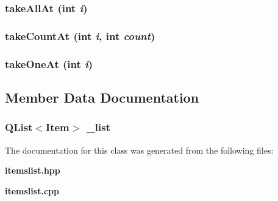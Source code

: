\subsubsection{ take\-All\-At (int {\em i})}\label{classItemsList_a6}


\subsubsection{ take\-Count\-At (int {\em i}, int {\em count})}\label{classItemsList_a8}


\subsubsection{ take\-One\-At (int {\em i})}\label{classItemsList_a7}




\subsection{Member Data Documentation}
\subsubsection{\setlength{\rightskip}{0pt plus 5cm}QList$<${\bf Item}$>$ {\bf \_\-list}\hspace{0.3cm}{\tt  [protected]}}\label{classItemsList_p0}




The documentation for this class was generated from the following files:\begin{CompactItemize}
\item 
{\bf itemslist.hpp}\item 
{\bf itemslist.cpp}\end{CompactItemize}
